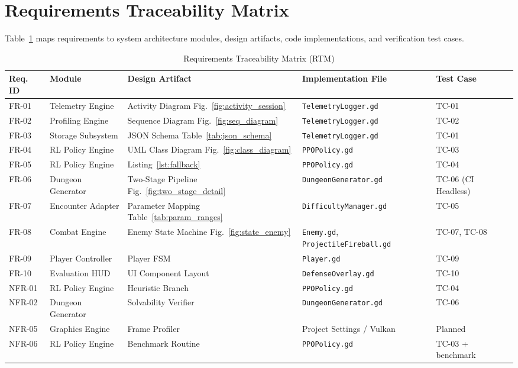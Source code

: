 \section{Requirements Traceability Matrix}
Table~\ref{tab:rtm} maps requirements to system architecture modules, design artifacts, code implementations, and verification test cases.

\begin{table}[!htbp]
\centering
\caption{Requirements Traceability Matrix (RTM)}
\label{tab:rtm}
\scriptsize
\begin{tabular}{p{}p{}p{}p{}p{}}
\toprule
\textbf{Req. ID} & \textbf{Module} & \textbf{Design Artifact} & \textbf{Implementation File} & \textbf{Test Case} \\
\midrule
FR-01 & Telemetry Engine & Activity Diagram Fig.~\ref{fig:activity_session} & \texttt{TelemetryLogger.gd} & TC-01 \\
FR-02 & Profiling Engine & Sequence Diagram Fig.~\ref{fig:seq_diagram} & \texttt{TelemetryLogger.gd} & TC-02 \\
FR-03 & Storage Subsystem & JSON Schema Table~\ref{tab:json_schema} & \texttt{TelemetryLogger.gd} & TC-01 \\
FR-04 & RL Policy Engine & UML Class Diagram Fig.~\ref{fig:class_diagram} & \texttt{PPOPolicy.gd} & TC-03 \\
FR-05 & RL Policy Engine & Listing~\ref{lst:fallback} & \texttt{PPOPolicy.gd} & TC-04 \\
FR-06 & Dungeon Generator & Two-Stage Pipeline Fig.~\ref{fig:two_stage_detail} & \texttt{DungeonGenerator.gd} & TC-06 (CI Headless) \\
FR-07 & Encounter Adapter & Parameter Mapping Table~\ref{tab:param_ranges} & \texttt{DifficultyManager.gd} & TC-05 \\
FR-08 & Combat Engine & Enemy State Machine Fig.~\ref{fig:state_enemy} & \texttt{Enemy.gd}, \texttt{ProjectileFireball.gd} & TC-07, TC-08 \\
FR-09 & Player Controller & Player FSM & \texttt{Player.gd} & TC-09 \\
FR-10 & Evaluation HUD & UI Component Layout & \texttt{DefenseOverlay.gd} & TC-10 \\
NFR-01 & RL Policy Engine & Heuristic Branch & \texttt{PPOPolicy.gd} & TC-04 \\
NFR-02 & Dungeon Generator & Solvability Verifier & \texttt{DungeonGenerator.gd} & TC-06 \\
NFR-05 & Graphics Engine & Frame Profiler & Project Settings / Vulkan & Planned \\
NFR-06 & RL Policy Engine & Benchmark Routine & \texttt{PPOPolicy.gd} & TC-03 + benchmark \\
\bottomrule
\end{tabular}
\end{table}
